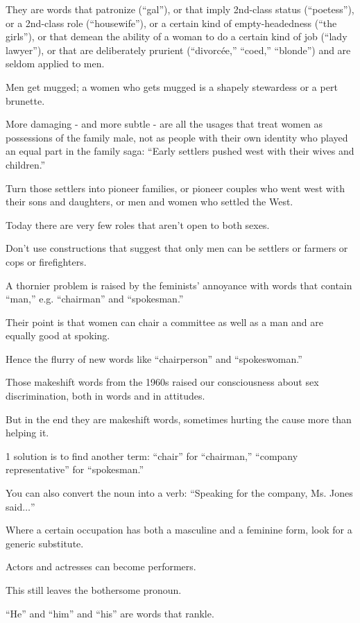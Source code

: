 \documentclass{book}
\numberwithin{equation}{section}
\begin{document}
They are words that patronize (``gal''), or that imply 2nd-class status (``poetess''), or a 2nd-class role (``housewife''), or a certain kind of empty-headedness (``the girls''), or that demean the ability of a woman to do a certain kind of job (``lady lawyer''), or that are deliberately prurient (``divorc\'ee,'' ``coed,'' ``blonde'') and are seldom applied to men.

Men get mugged; a women who gets mugged is a shapely stewardess or a pert brunette.

More damaging - and more subtle - are all the usages that treat women as possessions of the family male, not as people with their own identity who played an equal part in the family saga: ``Early settlers pushed west with their wives and children.''

Turn those settlers into pioneer families, or pioneer couples who went west with their sons and daughters, or men and women who settled the West.

Today there are very few roles that aren't open to both sexes.

Don't use constructions that suggest that only men can be settlers or farmers or cops or firefighters.

A thornier problem is raised by the feminists' annoyance with words that contain ``man,'' e.g. ``chairman'' and ``spokesman.''

Their point is that women can chair a committee as well as a man and are equally good at spoking.

Hence the flurry of new words like ``chairperson'' and ``spokeswoman.''

Those makeshift words from the 1960s raised our consciousness about sex discrimination, both in words and in attitudes.

But in the end they are makeshift words, sometimes hurting the cause more than helping it.

1 solution is to find another term: ``chair'' for ``chairman,'' ``company representative'' for ``spokesman.''

You can also convert the noun into a verb: ``Speaking for the company, Ms. Jones said$\ldots$''

Where a certain occupation has both a masculine and a feminine form, look for a generic substitute.

Actors and actresses can become performers.

%
This still leaves the bothersome pronoun.

``He'' and ``him'' and ``his'' are words that rankle.
\end{document}
